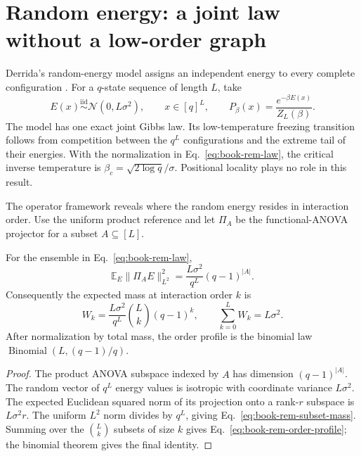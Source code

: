 \section{Random energy: a joint law without a low-order graph}

Derrida's random-energy model assigns an independent energy to every complete configuration
\cite{derrida1980}.  For a $q$-state sequence of length $L$, take
\begin{equation}
E(x)\overset{\mathrm{iid}}{\sim}\mathcal N(0,L\sigma^2),
\qquad x\in[q]^L,
\qquad
P_\beta(x)=\frac{e^{-\beta E(x)}}{Z_L(\beta)}.
\label{eq:book-rem-law}
\end{equation}
The model has one exact joint Gibbs law.  Its low-temperature freezing transition follows from
competition between the $q^L$ configurations and the extreme tail of their energies.  With the
normalization in Eq.~\ref{eq:book-rem-law}, the critical inverse temperature is
$\beta_c=\sqrt{2\log q}/\sigma$.  Positional locality plays no role in this result.

The operator framework reveals where the random energy resides in interaction order.  Use the
uniform product reference and let $\Pi_A$ be the functional-ANOVA projector for a subset
$A\subseteq[L]$.

\begin{proposition}
\label{prop:book-rem-anova}
For the ensemble in Eq.~\ref{eq:book-rem-law},
\begin{equation}
\mathbb E_E\|\Pi_AE\|_{L^2}^2
=\frac{L\sigma^2}{q^L}(q-1)^{|A|}.
\label{eq:book-rem-subset-mass}
\end{equation}
Consequently the expected mass at interaction order $k$ is
\begin{equation}
W_k
=\frac{L\sigma^2}{q^L}\binom{L}{k}(q-1)^k,
\qquad
\sum_{k=0}^{L}W_k=L\sigma^2.
\label{eq:book-rem-order-profile}
\end{equation}
After normalization by total mass, the order profile is the binomial law
$\operatorname{Binomial}(L,(q-1)/q)$.
\end{proposition}

\begin{proof}
The product ANOVA subspace indexed by $A$ has dimension $(q-1)^{|A|}$.  The random vector of
$q^L$ energy values is isotropic with coordinate variance $L\sigma^2$.  The expected Euclidean
squared norm of its projection onto a rank-$r$ subspace is $L\sigma^2r$.  The uniform $L^2$ norm
divides by $q^L$, giving Eq.~\ref{eq:book-rem-subset-mass}.  Summing over the
$\binom{L}{k}$ subsets of size $k$ gives Eq.~\ref{eq:book-rem-order-profile}; the binomial theorem
gives the final identity.
\end{proof}

